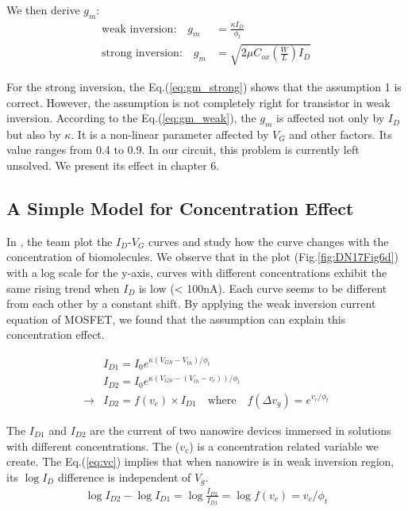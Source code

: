 We then derive $g_m$:
\begin{align}
    \text{weak inversion:} \quad g_m & = \frac{\kappa I_D}{\phi_t} \label{eq:gm_weak} \\
    \text{strong inversion:} \quad g_m & = \sqrt{2 \mu C_{ox} (\frac{W}{L})I_{D}} \label{eq:gm_strong}
\end{align}

For the strong inversion, the Eq.(\ref{eq:gm_strong}) shows that the assumption 1 is correct.
However, the assumption is not completely right for transistor in weak inversion.
According to the Eq.(\ref{eq:gm_weak}), the $g_m$ is affected not only by $I_D$ but also by $\kappa$.
It is a non-linear parameter affected by $V_G$ and other factors.
Its value ranges from 0.4 to 0.9.
In our circuit, this problem is currently left unsolved.
We present its effect in chapter 6.


\subsection{A Simple Model for Concentration Effect}
In \cite{DN17}, the team plot the $I_D$-$V_G$ curves and study how the curve changes with the concentration of biomolecules.
We observe that in the plot (Fig.\ref{fig:DN17Fig6d}) with a log scale for the y-axis, curves with different concentrations exhibit the same rising trend when $I_D$ is low (< 100nA).
Each curve seems to be different from each other by a constant shift.
By applying the weak inversion current equation of MOSFET, we found that the assumption can explain this concentration effect.

\begin{align}
    & I_{D1} = I_{0} e^{\kappa(V_{GS} - V_{th}) / \phi_t} \\
    & I_{D2} = I_{0} e^{\kappa(V_{GS} - (V_{th} - v_c)) / \phi_t} \\
    \rightarrow & I_{D2} = f(v_c) \times I_{D1} \quad \text{where} \quad f(\Delta v_g) = e^{v_c / \phi_t} \label{eq:vc}
\end{align}

The $I_{D1}$ and $I_{D2}$ are the current of two nanowire devices immersed in solutions with different concentrations.
The ($v_c$) is a concentration related variable we create.
The Eq.(\ref{eq:vc}) implies that when nanowire is in weak inversion region, its $\log I_D$ difference is independent of $V_g$.
\begin{align}
    \log I_{D2} - \log I_{D1} = \log \frac{I_{D2}}{I_{D1}} = \log f(v_c) = v_c / \phi_t
\end{align}

